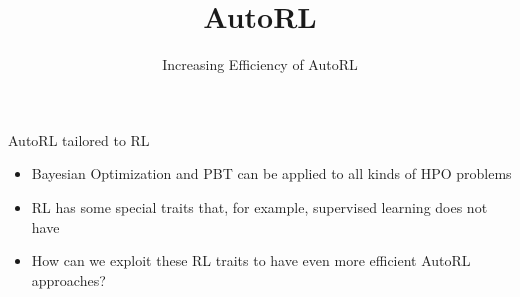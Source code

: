 \documentclass[aspectratio=169]{../latex_main/tntbeamer}  %
\title[AutoRL]{AutoRL}
\subtitle{Increasing Efficiency of AutoRL}
\begin{document}
	
	\maketitle


\begin{frame}[c]{AutoRL tailored to RL}

\begin{itemize}
    \item Bayesian Optimization and PBT can be applied to all kinds of HPO problems
    \item RL has some special traits that, for example, supervised learning does not have
    \item How can we exploit these RL traits to have even more efficient AutoRL approaches?
\end{itemize}

\end{frame}
\end{document}
